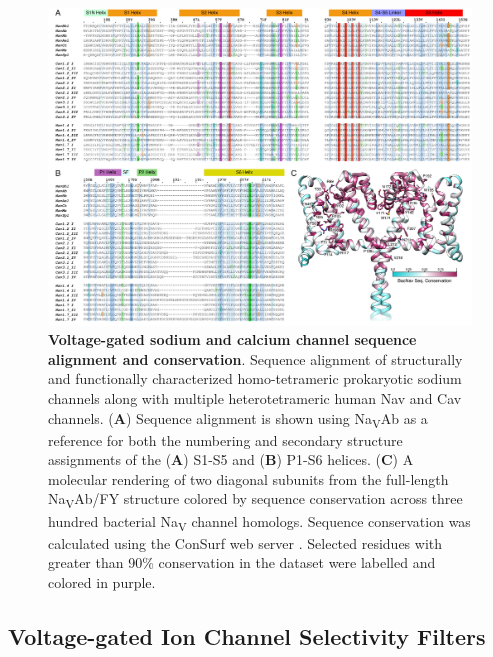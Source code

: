 \begin{refsection}
\begin{figure}[hp]
\centering
\includegraphics[width=1.0\textwidth]{introduction/sequence}
\caption[Voltage-gated sodium and calcium channel sequence alignment and conservation]{\textbf{Voltage-gated sodium and calcium channel sequence alignment and conservation}. Sequence alignment of structurally and functionally characterized homo-tetrameric prokaryotic sodium channels along with multiple heterotetrameric human Nav and Cav channels. (\textbf{A}) Sequence alignment is shown using Na\textsubscript{V}Ab as a reference for both the numbering and secondary structure assignments of the (\textbf{A}) S1-S5 and (\textbf{B}) P1-S6 helices. (\textbf{C}) A molecular rendering of two diagonal subunits from the full-length Na\textsubscript{V}Ab/FY structure \cite{Lenaeus:2017cy} colored by sequence conservation across three hundred bacterial Na\textsubscript{V} channel homologs. Sequence conservation was calculated using the ConSurf web server \cite{Landau:2005de}. Selected residues with greater than 90\% conservation in the dataset were labelled and colored in purple.}
\label{fig:sequence}
\end{figure}

\subsection{Voltage-gated Ion Channel Selectivity Filters}


\end{refsection}
